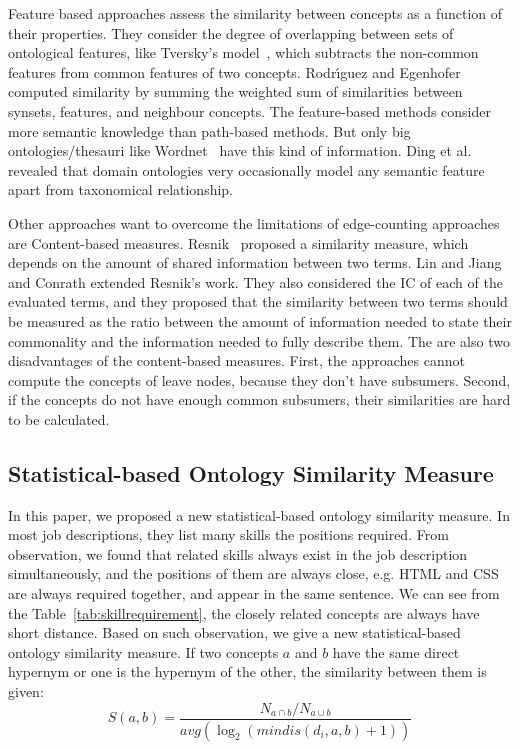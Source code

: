 Feature based approaches assess the similarity between concepts as a function of their properties. They consider the degree of overlapping between sets of ontological features, like Tversky's model~\cite{tverskyfeatures}, which subtracts the non-common features from common features of two concepts.
Rodr{\'\i}guez and Egenhofer~\cite{rodriguez2003determining} computed similarity by summing the weighted sum of similarities between synsets, features, and neighbour concepts. The feature-based methods consider more semantic knowledge than path-based methods. But only big ontologies/thesauri like Wordnet~\cite{miller1995wordnet} have this kind of information. Ding et al.~\cite{ding2004swoogle} revealed that domain ontologies very occasionally model any semantic feature apart from taxonomical relationship.


Other approaches want to overcome the limitations of edge-counting approaches are Content-based measures. Resnik~\cite{resnik1995using} proposed a similarity measure, which depends on the amount of shared information between two terms. Lin \cite{lin1998information} and Jiang and Conrath \cite{jiang1997semantic} extended Resnik's work. They also considered the IC of each of the evaluated terms, and they proposed that the similarity between two terms should be measured as the ratio between the amount of information needed to state their commonality and the information needed to fully describe them. The are also two disadvantages of the content-based measures. First, the approaches cannot compute the concepts of leave nodes, because they don't have subsumers. Second, if the concepts do not have enough common subsumers, their similarities are hard to be calculated.


\subsection{Statistical-based Ontology Similarity Measure }
In this paper, we proposed a new statistical-based ontology similarity measure. In most job descriptions, they list many skills the positions required. From observation, we found that related skills always exist in the job description simultaneously, and the positions of them are always close, e.g. HTML and CSS are always required together, and appear in the same sentence. We can see from the Table~\ref{tab:skillrequirement}, the closely related concepts are always have short distance. Based on such observation, we give a new statistical-based ontology similarity measure. If two concepts $a$ and $b$ have the same direct hypernym or one  is the hypernym of the other, the similarity between them is given:
$$ S(a,b) = \frac{  N_{a \cap b} / N_{a \cup b} }{avg(\log_2( mindis(d_i,a,b) + 1 ))} $$

